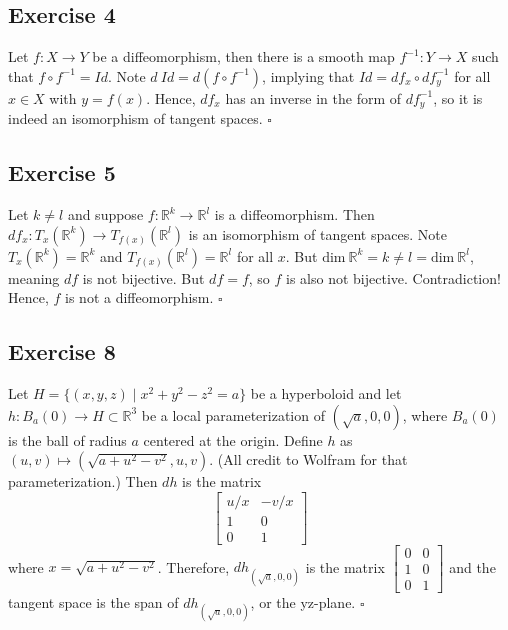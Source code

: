 \documentclass{article}
\begin{document}
\subsection*{Exercise 4}
Let $f\colon X\to Y$ be a diffeomorphism, then there is a smooth
map $f^{-1}\colon Y\to X$ such that $f\circ f^{-1}=Id$.
Note $d\ Id =d(f\circ f^{-1})$, implying that
$Id=df_x \circ df^{-1}_y$ for all $x\in X$ with $y=f(x)$.
Hence, $df_x$ has an inverse
in the form of $df^{-1}_y$, so it is indeed an isomorphism of
tangent spaces.
\hfill $\square$

\subsection*{Exercise 5}
Let $k\ne l$ and suppose $f\colon\mathbb{R}^k\to\mathbb{R}^l$
is a diffeomorphism. Then
$df_x\colon T_x(\mathbb{R}^k)\to T_{f(x)}(\mathbb{R}^l)$
is an isomorphism of tangent spaces.
Note $T_x(\mathbb{R}^k) = \mathbb{R}^k$ and
$T_{f(x)}(\mathbb{R}^l) = \mathbb{R}^l$ for all $x$.
But $\text{dim}\ \mathbb{R}^k=k \ne l = \text{dim}\ \mathbb{R}^l$,
meaning $df$ is not bijective. But $df=f$, so $f$ is also
not bijective. Contradiction! Hence, $f$ is not a diffeomorphism.
\hfill $\square$

\subsection*{Exercise 8}
Let $H=\{(x,y,z)\mid x^2+y^2-z^2=a\}$ be a hyperboloid and let
$h\colon B_a(0)\to H\subset\mathbb{R}^3$ be a local parameterization
of $(\sqrt{a},0,0)$, where $B_a(0)$ is the ball of radius $a$ centered
at the origin. Define $h$ as $(u,v)\mapsto(\sqrt{a+u^2-v^2},u,v)$. (All
credit to Wolfram for that parameterization.)
Then $dh$ is the matrix
\begin{equation*}
\begin{bmatrix}
    u/x & -v/x \\
    1 & 0 \\
	0 & 1
\end{bmatrix}
\end{equation*}
where $x=\sqrt{a+u^2-v^2}$. Therefore, $dh_{(\sqrt{a},0,0)}$ is the matrix
$\left[ \begin{smallmatrix} 0&0\\ 1&0\\ 0&1\end{smallmatrix} \right]$
and the tangent space is the span of $dh_{(\sqrt{a},0,0)}$,
or the yz-plane.
\hfill $\square$
\end{document}
